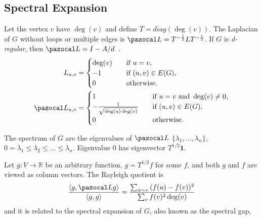 \subsection{Spectral Expansion}

Let the vertex $v$ have $\deg(v)$ and define $T=diag(\deg(v))$.
The Laplacian of $G$ without loops or multiple edges is
$\Laplacian=T^{-\frac{1}{2}}LT^{-\frac{1}{2}}$.
If $G$ is \textit{d-regular}, then $\Laplacian=I-A/d$~\cite{chu97}.
\begin{align}
    L_{u,v}&=
    \begin{cases}
        \deg(v) & \quad \text{if } u=v \text{,}\\
        -1      & \quad \text{if } (u,v)\in E(G),\\
        0       & \quad \text{otherwise.}
    \end{cases}\\
    \Laplacian_{u,v}&=
    \begin{cases}
        1                                   & \quad \text{if } u=v \text{ and } \deg(v) \neq 0 \text{,}\\
        -\frac{1}{\sqrt{\deg(u)\deg(v)}}    & \quad \text{if } (u,v)\in E(G),\\
        0                                   & \quad \text{otherwise.}
    \end{cases}
\end{align}

The spectrum of $G$ are the eigenvalues of $\Laplacian$ $\{\lambda_1,\ldots,\lambda_n\}$,
$0=\lambda_1 \leq \lambda_2 \leq \dots \leq \lambda_{n}$.
Eigenvalue $0$ has eigenvector $T^{1/2}\mathbf{1}$.

Let $g:V\to\mathbb{R}$ be an arbitrary function, $g=T^{1/2}f$ for some $f$,
and both $g$ and $f$ are viewed as column vectors.
The Rayleigh quotient is
\begin{equation}
    \frac{\langle g,\Laplacian g \rangle}{\langle g,g \rangle}
    =\frac{\sum_{u \sim v}{(f(u)-f(v))^2}}{\sum_{v}{f(v)^2\deg(v)}}
\end{equation}
%
and it is related to the spectral expansion of $G$, also known as the spectral gap,

